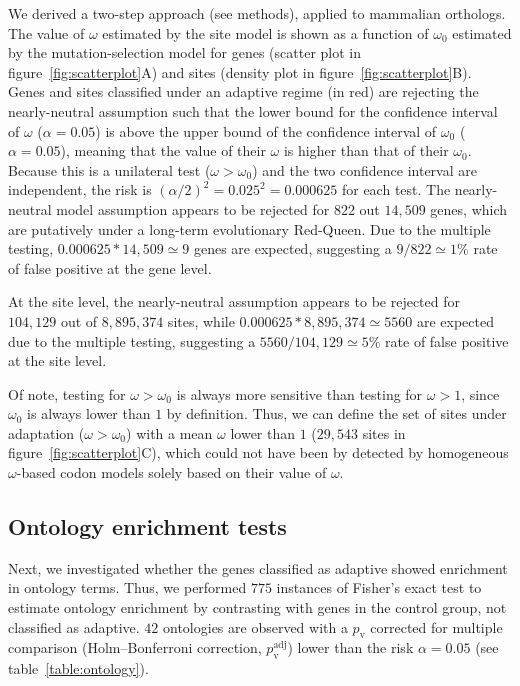 \documentclass{article}
\begin{document}
    We derived a two-step approach (see methods), applied to mammalian orthologs.
    The value of $\omega$ estimated by the site model is shown as a function of $\omega_{0}$ estimated by the mutation-selection model for genes (scatter plot in figure~\ref{fig:scatterplot}A) and sites (density plot in figure~\ref{fig:scatterplot}B).
    Genes and sites classified under an adaptive regime (in red) are rejecting the nearly-neutral assumption such that the lower bound for the confidence interval of $\omega$ ($\alpha=0.05$) is above the upper bound of the confidence interval of $\omega_{0}$ ($\alpha=0.05$), meaning that the value of their $\omega$ is higher than that of their $\omega_{0}$.
    Because this is a unilateral test ($\omega > \omega_{0}$) and the two confidence interval are independent, the risk is $(\alpha/2)^2=0.025^2=0.000625$ for each test.
    The nearly-neutral model assumption appears to be rejected for $822$ out $14,509$ genes, which are putatively under a long-term evolutionary Red-Queen.
    Due to the multiple testing, $0.000625 * 14,509 \simeq 9$ genes are expected, suggesting a $9 / 822 \simeq 1\%$ rate of false positive at the gene level.

    At the site level, the nearly-neutral assumption appears to be rejected for $104,129$ out of $8,895,374$ sites, while $0.000625 * 8,895,374 \simeq 5560$ are expected due to the multiple testing, suggesting a $5560 / 104,129 \simeq 5\%$ rate of false positive at the site level.

    Of note, testing for $\omega>\omega_{0}$ is always more sensitive than testing for $\omega>1$, since $\omega_{0}$ is always lower than $1$ by definition\cite{spielman_relationship_2015}.
    Thus, we can define the set of sites under adaptation ($\omega>\omega_{0}$) with a mean $\omega$ lower than $1$ ($29,543$ sites in figure~\ref{fig:scatterplot}C), which could not have been by detected by homogeneous $\omega$-based codon models solely based on their value of $\omega$.

    \subsection*{Ontology enrichment tests}

    Next, we investigated whether the genes classified as adaptive showed enrichment in ontology terms.
    Thus, we performed $775$ instances of Fisher's exact test to estimate ontology enrichment by contrasting with genes in the control group, not classified as adaptive.
    $42$ ontologies are observed with a $p_{\mathrm{v}}$ corrected for multiple comparison (Holm–Bonferroni correction, $p_{\mathrm{v}}^{\mathrm{adj}}$) lower than the risk $\alpha=0.05$ (see table~\ref{table:ontology}).
\end{document}
